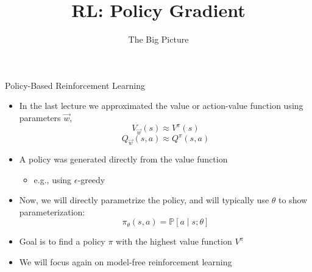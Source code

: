 


\title[Reinforcement Learning: Big Picture]{RL: Policy Gradient}
\subtitle{The Big Picture}




	
	\maketitle

\begin{frame}[c]{Policy-Based Reinforcement Learning}

\begin{itemize}
	\item In the last lecture we approximated the value or action-value function
	using parameters $\vec{w}$,
	$$V_{\vec{w}}(s) \approx V^\pi(s)$$
	$$Q_{\vec{w}}(s,a) \approx Q^\pi (s,a) $$
	\item A policy was generated directly from the value function
	\begin{itemize}
		\item e.g., using $\epsilon$-greedy
	\end{itemize}	
	\item Now, we will directly parametrize the policy, and will typically
	use $\theta$ to show parameterization:
	$$\pi_\theta (s,a) = \mathbb{P}[ a\mid s; \theta] $$
	\item Goal is to find a policy $\pi$ with the highest value function $V^\pi$
	\item We will focus again on model-free reinforcement learning
\end{itemize}

\end{frame}
